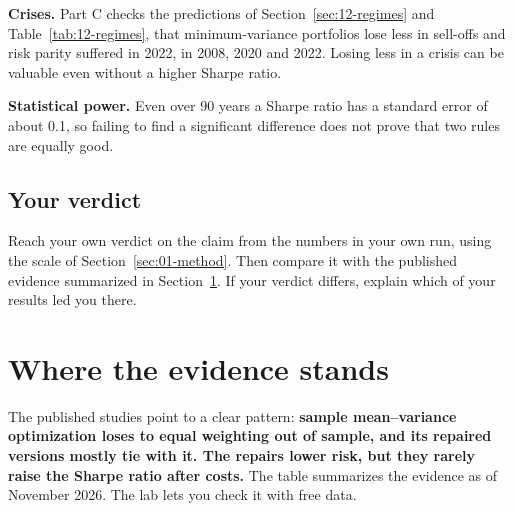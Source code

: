 \textbf{Crises.} Part C checks the predictions of Section~\ref{sec:12-regimes} and Table~\ref{tab:12-regimes}, that minimum-variance portfolios lose less in sell-offs and risk parity suffered in 2022, in 2008, 2020 and 2022. Losing less in a crisis can be valuable even without a higher Sharpe ratio.

\textbf{Statistical power.} Even over 90 years a Sharpe ratio has a standard error of about 0.1, so failing to find a significant difference does not prove that two rules are equally good.

\subsection*{Your verdict}

Reach your own verdict on the claim from the numbers in your own run, using the scale of Section~\ref{sec:01-method}. Then compare it with the published evidence summarized in Section~\ref{sec:12-verdict}. If your verdict differs, explain which of your results led you there.

\section{Where the evidence stands}
\label{sec:12-verdict}

The published studies point to a clear pattern: \textbf{sample mean--variance optimization loses to equal weighting out of sample, and its repaired versions mostly tie with it. The repairs lower risk, but they rarely raise the Sharpe ratio after costs.} The table summarizes the evidence as of November 2026. The lab lets you check it with free data.


